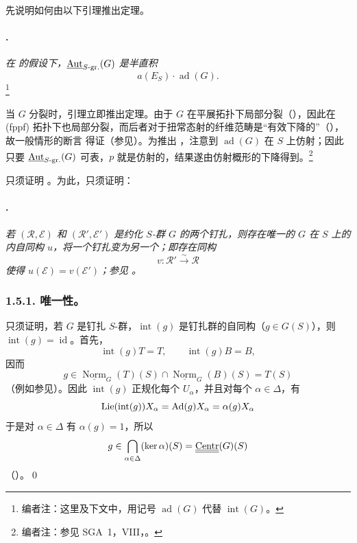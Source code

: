 先说明如何由以下引理推出定理。
\paragraph{.}
\emph{在 \textup{} 的假设下，\(\underline{\operatorname{Aut}}_{S\text{-}\mathrm{gr.}}(G)\) 是半直积}
\[
  a(E_S)\cdot\operatorname{ad}(G).
\]
\footnote{编者注：这里及下文中，用记号 \(\operatorname{ad}(G)\) 代替 \(\operatorname{int}(G)\)。}

当 \(G\) 分裂时，引理立即推出定理。由于 \(G\) 在平展拓扑下局部分裂（），因此在 \textup{(fppf)} 拓扑下也局部分裂，而后者对于扭常态射的纤维范畴是“有效下降的”（），故一般情形的断言 \textup{} 得证（参见）。为推出 \textup{}，注意到 \(\operatorname{ad}(G)\) 在 \(S\) 上仿射；因此只要 \(\underline{\operatorname{Aut}}_{S\text{-}\mathrm{gr.}}(G)\) 可表，\(p\) 就是仿射的，结果遂由仿射概形的下降得到。\footnote{编者注：参见 SGA~1，VIII，。}

只须证明 。为此，只须证明：
\paragraph{.}
\emph{若 \((\mathscr R,\mathcal E)\) 和 \((\mathscr R',\mathcal E')\) 是约化 \(S\)-群 \(G\) 的两个钉扎，则存在唯一的 \(G\) 在 \(S\) 上的内自同构 \(u\)，将一个钉扎变为另一个；即存在同构
\[
  v:\mathscr R'\xrightarrow{\sim}\mathscr R
\]
使得 \(u(\mathcal E)=v(\mathcal E')\)；参见 。}

\subsubsection*{1.5.1. 唯一性。}
只须证明，若 \(G\) 是钉扎 \(S\)-群，\(\operatorname{int}(g)\) 是钉扎群的自同构（\(g\in G(S)\)），则 \(\operatorname{int}(g)=\operatorname{id}\)。首先，
\[
  \operatorname{int}(g)T=T,\qquad
  \operatorname{int}(g)B=B,
\]
因而
\[
  g\in
  \underline{\operatorname{Norm}}_G(T)(S)
  \cap\underline{\operatorname{Norm}}_G(B)(S)
  =T(S)
\]
（例如参见）。因此 \(\operatorname{int}(g)\) 正规化每个 \(U_\alpha\)，并且对每个 \(\alpha\in\Delta\)，有
\[
  \operatorname{Lie}(\operatorname{int}(g))X_\alpha
  =\operatorname{Ad}(g)X_\alpha
  =\alpha(g)X_\alpha
\]
于是对 \(\alpha\in\Delta\) 有 \(\alpha(g)=1\)，所以
\[
  g\in
  \bigcap_{\alpha\in\Delta}(\ker\alpha)(S)
  =\underline{\underline{\operatorname{Centr}}}(G)(S)
\]
（）。\qed

